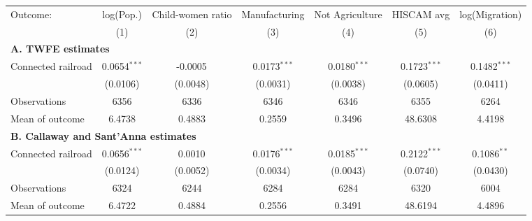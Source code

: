\begin{tabular}{lcccccc}
  \toprule
  Outcome: & log(Pop.) & Child-women ratio & Manufacturing & Not Agriculture & HISCAM avg & log(Migration) \\
           & (1) & (2) & (3) & (4) & (5) & (6) \\
  \midrule
  \multicolumn{7}{l}{\textbf{A. TWFE estimates}}\\
  Connected railroad &  0.0654$^{***}$ & -0.0005$^{}$ & 0.0173$^{***}$ & 0.0180$^{***}$ & 0.1723$^{***}$ & 0.1482$^{***}$  \\
                    &  (0.0106) & (0.0048) & (0.0031) & (0.0038) & (0.0605) & (0.0411)  \\
  \cmidrule(lr){2-7}
  Observations      &  6356 & 6336 & 6346 & 6346 & 6355 & 6264  \\
  Mean of outcome   &  6.4738 & 0.4883 & 0.2559 & 0.3496 & 48.6308 & 4.4198  \\
  \midrule
  \multicolumn{7}{l}{\textbf{B. Callaway and Sant'Anna estimates}}\\
  Connected railroad &  0.0656$^{***}$ & 0.0010$^{}$ & 0.0176$^{***}$ & 0.0185$^{***}$ & 0.2122$^{***}$ & 0.1086$^{**}$  \\
                    &  (0.0124) & (0.0052) & (0.0034) & (0.0043) & (0.0740) & (0.0430)  \\
  \cmidrule(lr){2-7}
  Observations      &  6324 & 6244 & 6284 & 6284 & 6320 & 6004  \\
  Mean of outcome   &  6.4722 & 0.4884 & 0.2556 & 0.3491 & 48.6194 & 4.4896  \\
  \bottomrule
\end{tabular}
